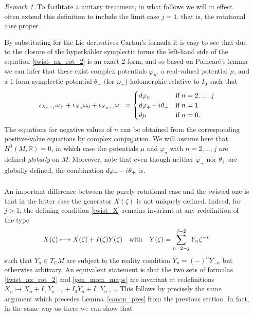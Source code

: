 \documentclass[11pt]{amsart}
\theoremstyle{remark}
\newtheorem*{remark}{Remark}
\theoremstyle{remark}
\theoremstyle{definition}
\theoremstyle{definition}
\theoremstyle{definition}
\newcommand{\0}{{\scriptstyle 0'}} %
\newcommand{\1}{{\scriptstyle 1'}}
\newcommand{\hp}{\hspace{0.5pt}} %
\begin{document}
\begin{remark}
To facilitate a unitary treatment, in what follows we will in effect often extend this definition to include the limit case $j=1$, that is, the rotational case proper.
\end{remark}

By substituting for the Lie derivatives Cartan's formula it is easy to see that due to the closure of the hyperk\"ahler symplectic forms the left-hand side of the equation \eqref{twist_ax_rot_2} is an exact 2-form, and so based on Poincar\'e's lemma we can infer that there exist complex potentials $\varphi_n$, a real-valued potential $\mu$, and a 1-form symplectic potential $\theta_+$ (for $\omega_+$) holomorphic relative to $I_0$ such that 
\begin{equation} \label{gen_mom_maps}
\iota_{X_{n-1}}\omega_+ + \iota_{X_{n}}\omega_0 + \iota_{X_{n+1}}\omega_- =
\begin{cases}
d\varphi_n & \text{if $n = 2,...\, , j$} \\
d\varphi_+ \!- i \hp \theta_+ & \text{if $n = 1$} \\
d\mu & \text{if $n=0$} \rlap{.}
\end{cases}
\end{equation}
The equations for negative values of $n$ can be obtained from the corresponding positive-value equations by complex conjugation. \pagebreak We will assume here that $H^1(M,\mathbb{R}) = 0$, in which case the potentials $\mu$ and $\varphi_n$ with $n=2,\dots,j$ are defined \textit{globally} on $M$. Moreover, note that even though neither $\varphi_+$ nor $\theta_+$ are globally defined, the combination $d\varphi_+ \!- i\hp \theta_+$ is.


\subsubsection{}


An important difference between the purely rotational case and the twisted one is that in the latter case the generator $X(\zeta)$ is not uniquely defined. Indeed, for $j>1$, the defining condition \eqref{twist_X} remains invariant at any redefinition of the type
\begin{equation}
X(\zeta) \longmapsto X(\zeta) + I(\zeta)Y(\zeta)
\quad\text{with}\quad
Y(\zeta) = \sum_{n =2-j}^{j-2} Y_n \hp \zeta^{-n}
\end{equation}
such that $Y_n \in T_{\mathbb{C}}M$ are subject to the reality condition \mbox{$\bar{Y}_{n} = (-)^n Y_{-n}$} but otherwise arbitrary. 
An equivalent statement is that the two sets of formulas \eqref{twist_ax_rot_2} and \eqref{gen_mom_maps}  are invariant at redefinitions \mbox{$X_n \longmapsto X_n + I_+Y_{n-1} + I_0 Y_n + I_- Y_{n+1}$}. This follows by precisely the same argument which precedes Lemma~\ref{canon_pres} from the previous section. In fact, in the same way as there we can show that 
\end{document}
